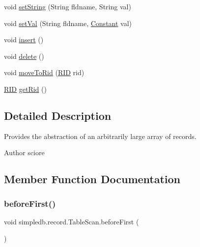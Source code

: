 \begin{DoxyCompactItemize}
void \hyperlink{classsimpledb_1_1record_1_1TableScan_a0d7d00cd93ce179297abf17b5900b750}{set\+String} (String fldname, String val)
\item 
void \hyperlink{classsimpledb_1_1record_1_1TableScan_aa43095f81b040417816d8493b66a91d3}{set\+Val} (String fldname, \hyperlink{classsimpledb_1_1query_1_1Constant}{Constant} val)
\item 
void \hyperlink{classsimpledb_1_1record_1_1TableScan_a45f93916b026b51b1511ba2610630564}{insert} ()
\item 
void \hyperlink{classsimpledb_1_1record_1_1TableScan_a6797bdf6cdf1cd9f73cb86b32ac339d7}{delete} ()
\item 
void \hyperlink{classsimpledb_1_1record_1_1TableScan_a21372d00e959d8bbe5eee1c8bda8f08b}{move\+To\+Rid} (\hyperlink{classsimpledb_1_1record_1_1RID}{R\+ID} rid)
\item 
\hyperlink{classsimpledb_1_1record_1_1RID}{R\+ID} \hyperlink{classsimpledb_1_1record_1_1TableScan_ae04ff0088830ea94e2af70bdbb398a80}{get\+Rid} ()
\end{DoxyCompactItemize}


\subsection{Detailed Description}
Provides the abstraction of an arbitrarily large array of records. \begin{DoxyAuthor}{Author}
sciore 
\end{DoxyAuthor}


\subsection{Member Function Documentation}
\mbox{\label{classsimpledb_1_1record_1_1TableScan_a2b5a99c638ace01efded11dd93cf9240}} 
\subsubsection{\texorpdfstring{before\+First()}{beforeFirst()}}
{\footnotesize\ttfamily void simpledb.\+record.\+Table\+Scan.\+before\+First (\begin{DoxyParamCaption}{ }\end{DoxyParamCaption})\hspace{0.3cm}{\ttfamily [inline]}}

